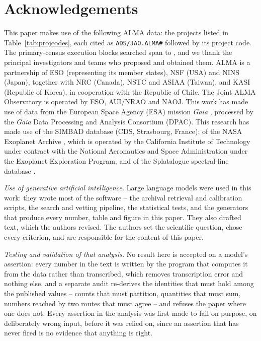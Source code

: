 \section*{Acknowledgements}
This paper makes use of the following ALMA data: the \NProjCodes{} projects
listed in Table~\ref{tab:projcodes}, each cited as \texttt{ADS/JAO.ALMA\#}
followed by its project code. The \NEB{} primary-census execution blocks
searched span \PrEbDateFirst{} to \PrEbDateLast{}, and we thank the principal
investigators and teams who proposed and obtained
them.\ProjCodeUnresClause{} ALMA is a partnership of ESO
(representing its member states), NSF (USA) and NINS (Japan), together with NRC
(Canada), NSTC and ASIAA (Taiwan), and KASI (Republic of Korea), in cooperation
with the Republic of Chile. The Joint ALMA Observatory is operated by ESO,
AUI/NRAO and NAOJ. This work has made use of data from the European Space
Agency (ESA) mission {\it Gaia} \citep{GaiaDR3}, processed by the {\it Gaia}
Data Processing and Analysis Consortium (DPAC). This research has made use
of the SIMBAD database \citep{SIMBAD2000} (CDS, Strasbourg, France); of the
NASA Exoplanet Archive \citep{NEA2013}, which is operated by the California
Institute of Technology under contract with the National Aeronautics and
Space Administration under the Exoplanet Exploration Program; and of the
Splatalogue spectral-line database \citep{Splatalogue2007}.

\emph{Use of generative artificial intelligence.} Large language models were
used in this work: they wrote most of the software -- the archival retrieval and
calibration scripts, the search and vetting pipeline, the statistical tests,
and the generators that produce every number, table and figure in this paper.
They also drafted text, which the authors revised. The authors set the
scientific question, chose every criterion, and are responsible for the content
of this paper.

\emph{Testing and validation of that analysis.} No result here is accepted on a
model's assertion: every number in the text is written by the program that
computes it from the data rather than transcribed, which removes transcription
error and nothing else, and a separate audit re-derives the identities that must
hold among the published values -- counts that must partition, quantities that
must sum, numbers reached by two routes that must agree -- and refuses the paper
where one does not. Every assertion in the analysis was first made to fail on
purpose, on deliberately wrong input, before it was relied on, since an
assertion that has never fired is no evidence that anything is right.

